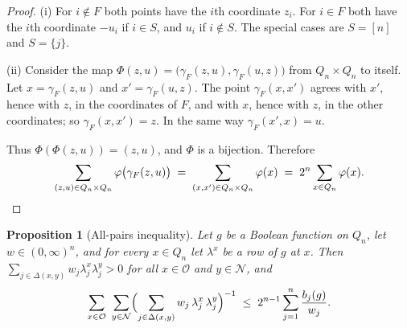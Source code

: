 \documentclass[11pt,reqno]{amsart}
\newtheorem{proposition}[theorem]{Proposition}
\theoremstyle{definition}
\theoremstyle{remark}
\numberwithin{equation}{section}
\theoremstyle{named}
\theoremstyle{plain}
\newcommand{\cO}{\mathcal{O}}
\newcommand{\cN}{\mathcal{N}}
\begin{document}
\begin{proof}
(i) For $i\notin F$ both points have the $i$th coordinate $z_i$. For $i\in F$ both have the $i$th
coordinate $-u_i$ if $i\in S$, and $u_i$ if $i\notin S$. The special cases are $S=[n]$ and
$S=\{j\}$.

(ii) Consider the map $\Phi(z,u)=\bigl(\gamma_F(z,u),\gamma_F(u,z)\bigr)$ from $Q_n\times Q_n$ to
itself. Let $x=\gamma_F(z,u)$ and $x'=\gamma_F(u,z)$. The point $\gamma_F(x,x')$ agrees with $x'$,
hence with $z$, in the coordinates of $F$, and with $x$, hence with $z$, in the other coordinates;
so $\gamma_F(x,x')=z$. In the same way $\gamma_F(x',x)=u$.

Thus $\Phi(\Phi(z,u))=(z,u)$, and $\Phi$
is a bijection. Therefore
\[
   \sum_{(z,u)\in Q_n\times Q_n}\varphi\bigl(\gamma_F(z,u)\bigr)
   \;=\;\sum_{(x,x')\in Q_n\times Q_n}\varphi(x)\;=\;2^{n}\sum_{x\in Q_n}\varphi(x). \qedhere
\]
\end{proof}

\begin{proposition}[All-pairs inequality]\label{prop:pairs}
Let $g$ be a Boolean function on $Q_n$, let $w\in(0,\infty)^{n}$, and for every $x\in Q_n$ let
$\lambda^{x}$ be a row of $g$ at $x$. Then
$\sum_{j\in\Delta(x,y)}w_j\lambda^{x}_j\lambda^{y}_j>0$ for all $x\in\cO$ and $y\in\cN$, and
\begin{equation}\label{eq:pairs}
   \sum_{x\in\cO}\ \sum_{y\in\cN}\Bigl(\sum_{j\in\Delta(x,y)}w_j\,\lambda^{x}_j\,\lambda^{y}_j\Bigr)^{-1}
   \;\le\;2^{n-1}\sum_{j=1}^{n}\frac{b_j(g)}{w_j}.
\end{equation}
\end{proposition}
\end{document}
